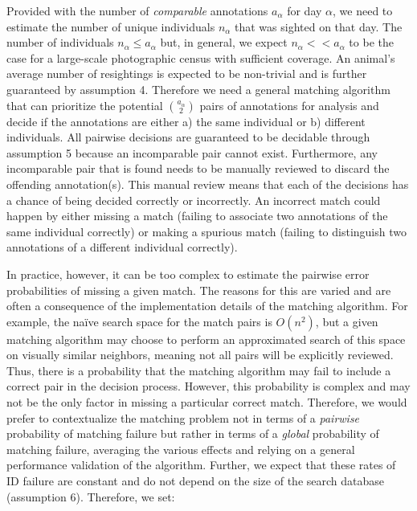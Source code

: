 Provided with the number of {\it comparable} annotations $a_{\alpha}$ for day $\alpha$, we need to estimate the number of unique individuals $n_{\alpha}$ that was sighted on that day.  The number of individuals $n_{\alpha} \leq a_{\alpha}$ but, in general, we expect $n_{\alpha} << a_{\alpha}$ to be the case for a large-scale photographic census with sufficient coverage.  An animal's average number of resightings is expected to be non-trivial and is further guaranteed by assumption 4.  Therefore we need a general matching algorithm that can prioritize the potential $\binom{a_{\alpha}}{2}$ pairs of annotations for analysis and decide if the annotations are either a) the same individual or b) different individuals.  All pairwise decisions are guaranteed to be decidable through assumption 5 because an incomparable pair cannot exist.  Furthermore, any incomparable pair that is found needs to be manually reviewed to discard the offending annotation(s).  This manual review means that each of the decisions has a chance of being decided correctly or incorrectly.  An incorrect match could happen by either missing a match (failing to associate two annotations of the same individual correctly) or making a spurious match (failing to distinguish two annotations of a different individual correctly).

In practice, however, it can be too complex to estimate the pairwise error probabilities of missing a given match.  The reasons for this are varied and are often a consequence of the implementation details of the matching algorithm.  For example, the na\"ive search space for the match pairs is $O(n^2)$, but a given matching algorithm may choose to perform an approximated search of this space on visually similar neighbors, meaning not all pairs will be explicitly reviewed.  Thus, there is a probability that the matching algorithm may fail to include a correct pair in the decision process. However, this probability is complex and may not be the only factor in missing a particular correct match. Therefore, we would prefer to contextualize the matching problem not in terms of a {\it pairwise} probability of matching failure but rather in terms of a {\it global} probability of matching failure, averaging the various effects and relying on a general performance validation of the algorithm.  Further, we expect that these rates of ID failure are constant and do not depend on the size of the search database (assumption 6). Therefore, we set:

